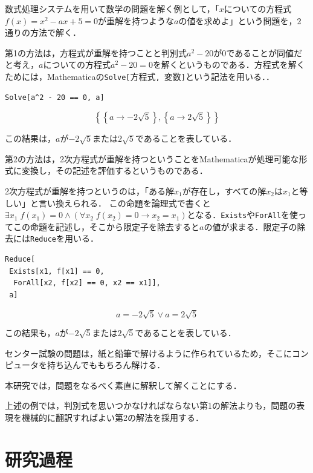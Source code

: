 数式処理システムを用いて数学の問題を解く例として，「$x$についての方程式$f(x)=x^2-ax+5=0$が重解を持つような$a$の値を求めよ」という問題を，2通りの方法で解く．

第1の方法は，方程式が重解を持つことと判別式$a^2-20$が$0$であることが同値だと考え，$a$についての方程式$a^2-20=0$を解くというものである．方程式を解くためには，Mathematicaの\verb|Solve[|方程式\verb|, |変数\verb|]|という記法を用いる．\cite{wolfram2014}．

\begin{verbatim}
Solve[a^2 - 20 == 0, a]
\end{verbatim}

\vspace{-5mm}\[\left\{\left\{a\to -2 \sqrt{5}\right\},\left\{a\to 2 \sqrt{5}\right\}\right\}\]

この結果は，$a$が$-2\sqrt{5}$または$2\sqrt{5}$であることを表している．

第2の方法は，2次方程式が重解を持つということをMathematicaが処理可能な形式に変換し，その記述を評価するというものである．

2次方程式が重解を持つというのは，「ある解$x_1$が存在し，すべての解$x_2$は$x_1$と等しい」と言い換えられる．
この命題を論理式で書くと$\exists x_1\;f(x_1)=0\land\left(\forall x_2\;f(x_2)=0\to x_2=x_1\right)$となる．\verb|Exists|や\verb|ForAll|を使ってこの命題を記述し，そこから限定子を除去すると$a$の値が求まる．限定子の除去には\verb|Reduce|を用いる．

\begin{verbatim}
Reduce[
 Exists[x1, f[x1] == 0,
  ForAll[x2, f[x2] == 0, x2 == x1]],
 a]
\end{verbatim}

\vspace{-5mm}\[a=-2 \sqrt{5}\lor a=2 \sqrt{5}\]

この結果も，$a$が$-2\sqrt{5}$または$2\sqrt{5}$であることを表している．

センター試験の問題は，紙と鉛筆で解けるように作られているため，そこにコンピュータを持ち込んでももちろん解ける．

本研究では，問題をなるべく素直に解釈して解くことにする．

上述の例では，判別式を思いつかなければならない第1の解法よりも，問題の表現を機械的に翻訳すればよい第2の解法を採用する．

\clearpage

\section{研究過程}

